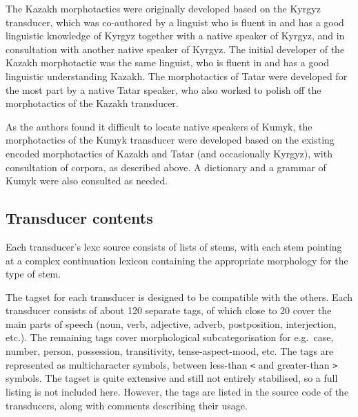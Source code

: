 \documentclass[a4paper,11pt,twocolumn]{article}
\begin{document}
The Kazakh morphotactics were originally developed based on the Kyrgyz transducer, which was co-authored by a linguist who is fluent in and has a good linguistic knowledge of Kyrgyz together with a native speaker of Kyrgyz, and in consultation with another native speaker of Kyrgyz.  The initial developer of the Kazakh morphotactic was the same linguist, who is fluent in and has a good linguistic understanding Kazakh.  The morphotactics of Tatar were developed for the most part by a native Tatar speaker, who also worked to polish off the morphotactics of the Kazakh transducer.

As the authors found it difficult to locate native speakers of Kumyk, the morphotactics of the Kumyk transducer were developed based on the existing encoded morphotactics of Kazakh and Tatar (and occasionally Kyrgyz), with consultation of corpora, as described above.  A dictionary \citep{bammatov1960} and a grammar \citep{olmesov2000} of Kumyk were also consulted as needed.


\subsection{Transducer contents}

Each transducer's lexc source consists of lists of stems, with each stem pointing at a complex continuation lexicon containing the appropriate morphology for the type of stem.  

The tagset for each transducer is designed to be compatible with the others.  Each transducer consists of about 120 separate tags, of which close to 20 cover the main parts of speech (noun, verb, adjective, adverb, postposition, interjection, etc.).  The remaining tags cover morphological subcategorisation for e.g.\ case, number, person, possession, transitivity, tense-aspect-mood, etc.  The tags are represented as multicharacter symbols, between less-than \texttt{<} and greater-than \texttt{>} symbols.  The tagset is quite extensive and still not entirely stabilised, so a full listing is not included here.  However, the tags are listed in the source code of the transducers, along with comments describing their usage.

\end{document}

